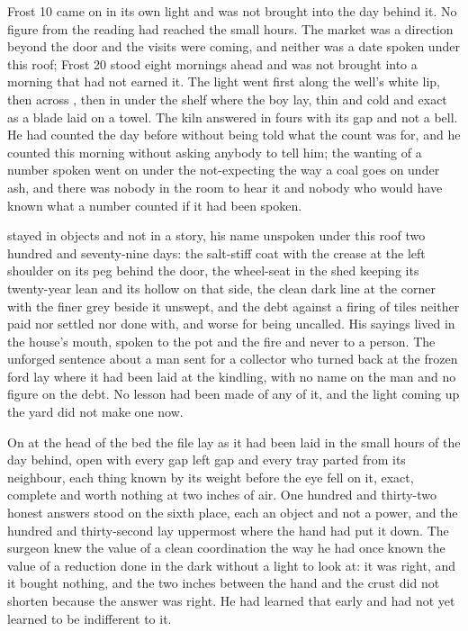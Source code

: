 Frost 10 came on in its own light and was not brought into the day behind it. No figure from the reading had reached the small hours. The market was a direction beyond the door and the visits were coming, and neither was a date spoken under this roof; Frost 20 stood eight mornings ahead and was not brought into a morning that had not earned it. The light went first along the well's white lip, then across , then in under the shelf where the boy lay, thin and cold and exact as a blade laid on a towel. The kiln answered in fours with its gap and not a bell. He had counted the day before without being told what the count was for, and he counted this morning without asking anybody to tell him; the wanting of a number spoken went on under the not-expecting the way a coal goes on under ash, and there was nobody in the room to hear it and nobody who would have known what a number counted if it had been spoken.

 stayed in objects and not in a story, his name unspoken under this roof two hundred and seventy-nine days: the salt-stiff coat with the crease at the left shoulder on its peg behind the door, the wheel-seat in the shed keeping its twenty-year lean and its hollow on that side, the clean dark line at the corner with the finer grey beside it unswept, and the debt against a firing of tiles neither paid nor settled nor done with, and worse for being uncalled. His sayings lived in the house's mouth, spoken to the pot and the fire and never to a person. The unforged sentence about a man sent for a collector who turned back at the frozen ford lay where it had been laid at the kindling, with no name on the man and no figure on the debt. No lesson had been made of any of it, and the light coming up the yard did not make one now.

On  at the head of the bed the file lay as it had been laid in the small hours of the day behind, open with every gap left gap and every tray parted from its neighbour, each thing known by its weight before the eye fell on it, exact, complete and worth nothing at two inches of air. One hundred and thirty-two honest answers stood on the sixth place, each an object and not a power, and the hundred and thirty-second lay uppermost where the hand had put it down. The surgeon knew the value of a clean coordination the way he had once known the value of a reduction done in the dark without a light to look at: it was right, and it bought nothing, and the two inches between the hand and the crust did not shorten because the answer was right. He had learned that early and had not yet learned to be indifferent to it.

